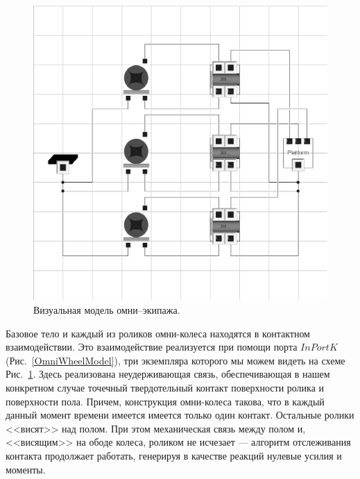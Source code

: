 \begin{figure}[htb]
\centering\includegraphics[width=15cm]{content/parts/3_friction/nd/OmniVehicleModel.eps}
\caption{Визуальная модель омни--экипажа.}
\label{OmniVehicle}
\end{figure}

Базовое тело и каждый из роликов омни-колеса находятся в контактном 
взаимодействии. Это взаимодействие реализуется при помощи порта $InPortK$
(Рис.~\ref{OmniWheelModel}), три экземпляра которого мы можем видеть на схеме
Рис.~\ref{OmniVehicle}. Здесь реализована неудерживающая связь, обеспечивающая 
в нашем конкретном случае точечный твердотельный контакт поверхности ролика и
поверхности пола. Причем, конструкция омни-колеса такова, что в каждый данный 
момент времени имеется имеется только один контакт. Остальные ролики <<висят>>
над полом. При этом механическая связь между полом и, <<висящим>> на ободе
колеса, роликом не исчезает --- алгоритм отслеживания контакта продолжает 
работать, генерируя в качестве реакций нулевые усилия и моменты.

